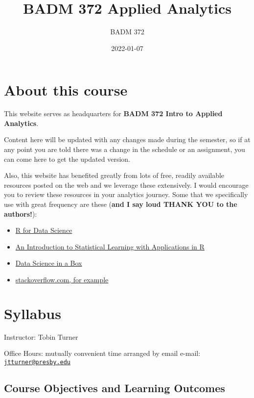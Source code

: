\documentclass[
]{book}
\title{BADM 372 Applied Analytics}
\author{BADM 372}
\date{2022-01-07}
\providecommand{\tightlist}{%
  \setlength{\itemsep}{0pt}\setlength{\parskip}{0pt}}
\theoremstyle{definition}
\theoremstyle{definition}
\theoremstyle{definition}
\theoremstyle{definition}
\theoremstyle{remark}
\begin{document}
\maketitle

{
\setcounter{tocdepth}{1}
\tableofcontents
}
\hypertarget{about-this-course}{%
\chapter{About this course}\label{about-this-course}}

This website serves as headquarters for \textbf{BADM 372 Intro to Applied Analytics}.

Content here will be updated with any changes made during the semester, so if at any point you are told there was a change in the schedule or an assignment, you can come here to get the updated version.

Also, this website has benefited greatly from lots of free, readily available resources posted on the web and we leverage these extensively. I would encourage you to review these resources in your analytics journey. Some that we specifically use with great frequency are these (\textbf{and I say loud THANK YOU to the authors!}):

\begin{itemize}
\tightlist
\item
  \href{https://r4ds.had.co.nz/}{R for Data Science}
\item
  \href{https://trevorhastie.github.io/ISLR/}{An Introduction to Statistical Learning with Applications in R}
\item
  \href{https://datasciencebox.org/}{Data Science in a Box}
\item
  \href{https://stackoverflow.com/questions/4862178/remove-rows-with-all-or-some-nas-missing-values-in-data-frame?rq=1}{stackoverflow.com, for example}
\end{itemize}

\hypertarget{syllabus}{%
\chapter{Syllabus}\label{syllabus}}

Instructor: Tobin Turner

Office Hours: mutually convenient time arranged by email e-mail: \href{mailto:jtturner@presby.edu}{\nolinkurl{jtturner@presby.edu}}

\hypertarget{course-objectives-and-learning-outcomes}{%
\section{Course Objectives and Learning Outcomes}\label{course-objectives-and-learning-outcomes}}
\end{document}
